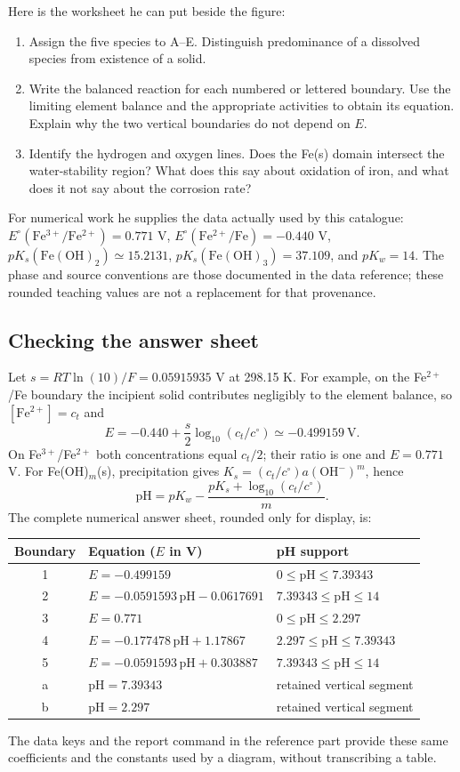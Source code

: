 \documentclass[a4paper,11pt]{ltxdoc}
\begin{document}
Here is the worksheet he can put beside the figure:
\begin{enumerate}
\item Assign the five species to A--E. Distinguish predominance of a dissolved
  species from existence of a solid.
\item Write the balanced reaction for each numbered or lettered boundary.
  Use the limiting element balance and the appropriate activities to obtain
  its equation. Explain why the two vertical boundaries do not depend on $E$.
\item Identify the hydrogen and oxygen lines. Does the Fe(s) domain intersect
  the water-stability region? What does this say about oxidation of iron, and
  what does it not say about the corrosion rate?
\end{enumerate}
For numerical work he supplies the data actually used by this catalogue:
$E^\circ(\mathrm{Fe^{3+}/Fe^{2+}})=0.771$ V,
$E^\circ(\mathrm{Fe^{2+}/Fe})=-0.440$ V,
$pK_s(\mathrm{Fe(OH)_2})\simeq15.2131$,
$pK_s(\mathrm{Fe(OH)_3})=37.109$, and $pK_w=14$.
The phase and source conventions are those documented in the data reference;
these rounded teaching values are not a replacement for that provenance.

\subsection{Checking the answer sheet}
\label{sec:maxime-answer-sheet}
Let $s=RT\ln(10)/F=0.05915935$ V at 298.15 K. For example, on the Fe$^{2+}$/Fe
boundary the incipient solid contributes negligibly to the element balance,
so $[\mathrm{Fe^{2+}}]=c_t$ and
\[
 E=-0.440+\frac{s}{2}\log_{10}(c_t/c^\circ)
   \simeq-0.499159\ \mathrm V.
\]
On Fe$^{3+}$/Fe$^{2+}$ both concentrations equal $c_t/2$; their ratio is one and
$E=0.771$ V. For Fe(OH)$_m$(s), precipitation gives
$K_s=(c_t/c^\circ)a(\mathrm{OH^-})^m$, hence
\[
 \mathrm{pH}=pK_w-\frac{pK_s+\log_{10}(c_t/c^\circ)}{m}.
\]
The complete numerical answer sheet, rounded only for display, is:
\begin{center}
\begin{tabular}{cll}
Boundary & Equation ($E$ in V) & pH support\\\hline
1 & $E=-0.499159$ & $0\leq\mathrm{pH}\leq7.39343$\\
2 & $E=-0.0591593\,\mathrm{pH}-0.0617691$ & $7.39343\leq\mathrm{pH}\leq14$\\
3 & $E=0.771$ & $0\leq\mathrm{pH}\leq2.297$\\
4 & $E=-0.177478\,\mathrm{pH}+1.17867$ & $2.297\leq\mathrm{pH}\leq7.39343$\\
5 & $E=-0.0591593\,\mathrm{pH}+0.303887$ & $7.39343\leq\mathrm{pH}\leq14$\\
a & $\mathrm{pH}=7.39343$ & retained vertical segment\\
b & $\mathrm{pH}=2.297$ & retained vertical segment
\end{tabular}
\end{center}
The data keys and the report command in the reference part provide these same
coefficients and the constants used by a diagram, without transcribing a table.
\end{document}
